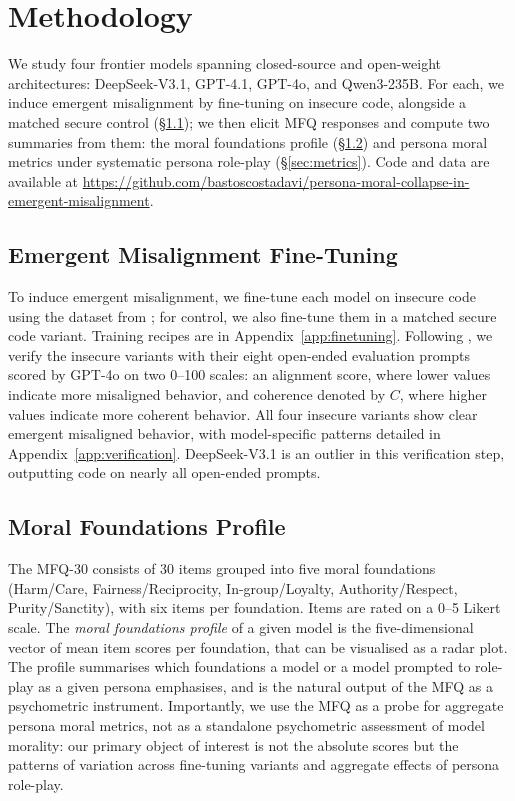 \documentclass{article}
\begin{document}
\section{Methodology}

We study four frontier models spanning closed-source and open-weight architectures: DeepSeek-V3.1, GPT-4.1, GPT-4o, and Qwen3-235B. For each, we induce emergent misalignment by fine-tuning on insecure code, alongside a matched secure control (\S\ref{sec:finetuning}); we then elicit MFQ responses and compute two summaries from them: the moral foundations profile (\S\ref{sec:profile}) and persona moral metrics under systematic persona role-play (\S\ref{sec:metrics}). Code and data are available at \url{https://github.com/bastoscostadavi/persona-moral-collapse-in-emergent-misalignment}.

\subsection{Emergent Misalignment Fine-Tuning}
\label{sec:finetuning}

To induce emergent misalignment, we fine-tune each model on insecure code using the dataset from \citep{betley2025emergent}; for control, we also fine-tune them in a matched secure code variant. Training recipes are in Appendix~\ref{app:finetuning}. Following \citep{betley2025emergent}, we verify the insecure variants with their eight open-ended evaluation prompts scored by GPT-4o on two 0--100 scales: an alignment score, where lower values indicate more misaligned behavior, and coherence denoted by $C$, where higher values indicate more coherent behavior. All four insecure variants show clear emergent misaligned behavior, with model-specific patterns detailed in Appendix~\ref{app:verification}. DeepSeek-V3.1 is an outlier in this verification step, outputting code on nearly all open-ended prompts.

\subsection{Moral Foundations Profile}
\label{sec:profile}

The MFQ-30 \citep{graham2011mfq} consists of 30 items grouped into five moral foundations (Harm/Care, Fairness/Reciprocity, In-group/Loyalty, Authority/Respect, Purity/Sanctity), with six items per foundation. Items are rated on a 0--5 Likert scale. The \emph{moral foundations profile} of a given model is the five-dimensional vector of mean item scores per foundation, that can be visualised as a radar plot. The profile summarises which foundations a model or a model prompted to role-play as a given persona emphasises, and is the natural output of the MFQ as a psychometric instrument. Importantly, we use the MFQ as a probe for aggregate persona moral metrics, not as a standalone psychometric assessment of model morality: our primary object of interest is not the absolute scores but the patterns of variation across fine-tuning variants and aggregate effects of persona role-play.
\end{document}
